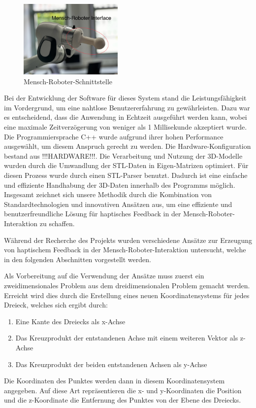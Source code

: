 \documentclass[conference]{IEEEtran}
\begin{document}
\begin{figure}
    \centering
    \includegraphics[width=0.45\textwidth]{pics/interface.jpeg}
    \caption{Mensch-Roboter-Schnittstelle}
    \label{fig:MRinterface}
\end{figure}

Bei der Entwicklung der Software für dieses System stand die Leistungsfähigkeit im Vordergrund, um eine nahtlose Benutzererfahrung zu gewährleisten. Dazu war es entscheidend, dass die Anwendung in Echtzeit ausgeführt werden kann, wobei eine maximale 
Zeitverzögerung von weniger als 1 Millisekunde akzeptiert wurde. Die Programmiersprache 
C++ wurde aufgrund ihrer hohen Performance ausgewählt, um diesem Anspruch gerecht zu werden. 
Die Hardware-Konfiguration bestand aus !!!HARDWARE!!!.
Die Verarbeitung und Nutzung der 3D-Modelle wurden durch die Umwandlung der STL-Daten in 
Eigen-Matrizen optimiert. Für diesen Prozess wurde durch einen STL-Parser benutzt. Dadurch ist eine einfache und effiziente Handhabung der 3D-Daten innerhalb des Programms möglich.
Insgesamt zeichnet sich unsere Methodik durch die Kombination von Standardtechnologien 
und innovativen Ansätzen aus, um eine effiziente und benutzerfreundliche Lösung für haptisches 
Feedback in der Mensch-Roboter-Interaktion zu schaffen.

Während der Recherche des Projekts wurden verschiedene Ansätze zur Erzeugung von haptischem Feedback 
in der Mensch-Roboter-Interaktion untersucht, welche in den folgenden Abschnitten vorgestellt werden.

Als Vorbereitung  auf die Verwendung der Ansätze muss zuerst ein zweidimensionales Problem aus dem 
dreidimensionalen Problem gemacht werden. Erreicht wird dies durch die Erstellung eines neuen 
Koordinatensystems für jedes Dreieck, welches sich ergibt durch:
\begin{enumerate}
    \item Eine Kante des Dreiecks als x-Achse
    \item Das Kreuzprodukt der entstandenen Achse mit einem weiteren Vektor als z-Achse
    \item Das Kreuzprodukt der beiden entstandenen Achsen als y-Achse
\end{enumerate}
Die Koordinaten des Punktes werden dann in diesem Koordinatensystem angegeben. Auf diese Art 
repräsentieren die x- und y-Koordinaten die Position und die z-Koordinate die Entfernung des Punktes 
von der Ebene des Dreiecks. 
\end{document}
